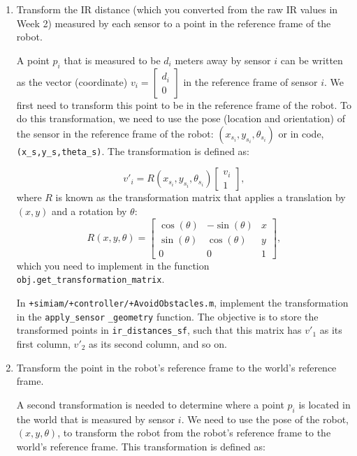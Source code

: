 \documentclass[10pt]{article}
\begin{document}
\begin{enumerate}
  \item Transform the IR distance (which you converted from the raw IR values in Week 2) measured by each sensor to a point in the reference frame of the robot.
  
  A point $p_i$ that is measured to be $d_i$ meters away by sensor $i$ can be written as the vector (coordinate) $v_i=\begin{bmatrix}d_i \\ 0\end{bmatrix}$ in the reference frame of sensor $i$. We first need to transform this point to be in the reference frame of the robot. To do this transformation, we need to use the pose (location and orientation) of the sensor in the reference frame of the robot: $(x_{s_i},y_{s_i},\theta_{s_i})$ or in code, \texttt{(x\_s,y\_s,theta\_s)}. The transformation is defined as:
  
  \begin{equation*}
    v'_i = R(x_{s_i},y_{s_i},\theta_{s_i})\begin{bmatrix}v_i \\ 1\end{bmatrix},
  \end{equation*}
  where $R$ is known as the transformation matrix that applies a translation by $(x,y)$ and a rotation by $\theta$:
  \begin{equation*}
    R(x,y,\theta) = \begin{bmatrix}\cos(\theta) & -\sin(\theta) & x \\ 
                                   \sin(\theta) &  \cos(\theta) & y \\
                                             0 &            0 & 1\end{bmatrix},
  \end{equation*}
  which you need to implement in the function \texttt{obj.get\_transformation\_matrix}.
  
  In \texttt{+simiam/+controller/+AvoidObstacles.m}, implement the transformation in the \texttt{apply\_sensor} \texttt{\_geometry} function. The objective is to store the transformed points in \texttt{ir\_distances\_sf}, such that this matrix has $v'_1$ as its first column, $v'_2$ as its second column, and so on.
  
  \item Transform the point in the robot's reference frame to the world's reference frame.
  
  A second transformation is needed to determine where a point $p_i$ is located in the world that is measured by sensor $i$. We need to use the pose of the robot, $(x,y,\theta)$, to transform the robot from the robot's reference frame to the world's reference frame. This transformation is defined as:
  

\end{enumerate}
\end{document}
